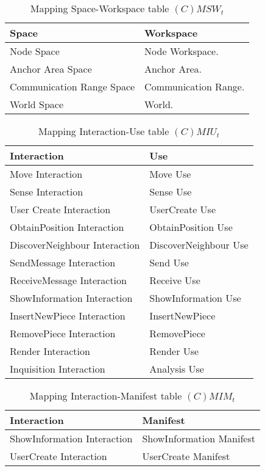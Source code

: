 \begin{table}[H]
	\centering
	\begin{tabular}{|p{4cm}|p{8cm}|}
			\hline
			\textbf{Space} & \textbf{Workspace} \\
			\hline
			Node Space & Node Workspace. \\
			\hline
			Anchor Area Space & Anchor Area. \\
			\hline
			Communication Range Space & Communication Range.\\
			\hline
			World Space & World. \\
			\hline
		\end{tabular}
	\caption{Mapping Space-Workspace table $(C)MSW_t$}
	\label{tab:cmsrt}
\end{table}

\begin{table}[H]
	\centering
	\begin{tabular}{|p{4cm}|p{8cm}|}
			\hline
			\textbf{Interaction} & \textbf{Use} \\
			\hline
			Move Interaction & Move Use \\
			\hline
			Sense Interaction & Sense Use \\
			\hline
			User Create Interaction & UserCreate Use \\
			\hline
			ObtainPosition Interaction & ObtainPosition Use \\	
			\hline
			DiscoverNeighbour Interaction & DiscoverNeighbour Use \\	
			\hline
			SendMessage Interaction & Send Use \\	
			\hline
			ReceiveMessage Interaction & Receive Use \\	
			\hline
			ShowInformation Interaction & ShowInformation Use \\
			\hline
			InsertNewPiece Interaction & InsertNewPiece \\
			\hline
			RemovePiece Interaction & RemovePiece \\
			\hline
			Render Interaction & Render Use \\
			\hline
			Inquisition Interaction & Analysis Use \\
			\hline
		\end{tabular}
	\caption{Mapping Interaction-Use table $(C)MIU_t$}
	\label{tab:cmiut}
\end{table}

\begin{table}[H]
	\centering
	\begin{tabular}{|p{4cm}|p{8cm}|}
			\hline
			\textbf{Interaction} & \textbf{Manifest} \\
			\hline
			ShowInformation Interaction & ShowInformation Manifest \\
			\hline
			UserCreate Interaction & UserCreate Manifest \\
			\hline
		\end{tabular}
	\caption{Mapping Interaction-Manifest table $(C)MIM_t$}
	\label{tab:cmimt}
\end{table}

